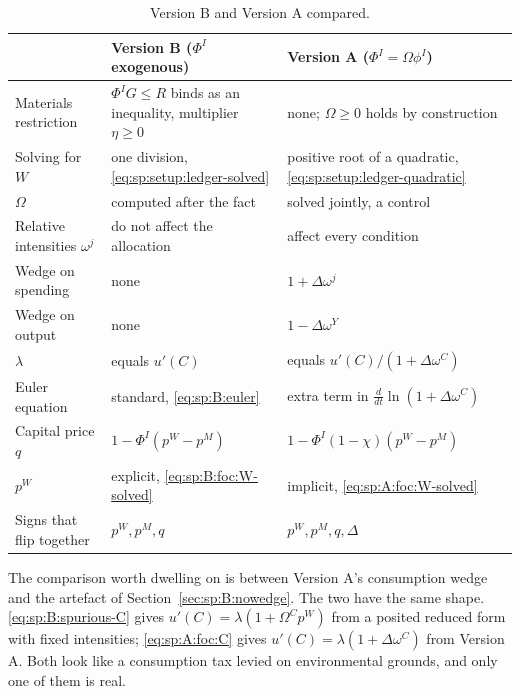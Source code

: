 \begin{table}[H]
\centering
\caption{Version B and Version A compared.}
\label{tab:sp:versions}
\setlength{\tabcolsep}{5pt}
\renewcommand{\arraystretch}{1.05}
\begin{tabular}{@{}p{}p{}p{}@{}}
\toprule
 & Version B ($\Phi^I$ exogenous) & Version A ($\Phi^I=\Omega\phi^I$) \\
\midrule
Materials restriction & $\Phi^IG\le R$ binds as an inequality, multiplier $\eta\ge0$
& none; $\Omega\ge0$ holds by construction \\
Solving for $W$ & one division, \eqref{eq:sp:setup:ledger-solved}
& positive root of a quadratic, \eqref{eq:sp:setup:ledger-quadratic} \\
$\Omega$ & computed after the fact & solved jointly, a control \\
Relative intensities $\omega^j$ & do not affect the allocation & affect every condition \\
Wedge on spending & none & $1+\Delta\omega^j$ \\
Wedge on output & none & $1-\Delta\omega^Y$ \\
$\lambda$ & equals $u'(C)$ & equals $u'(C)/\left(1+\Delta\omega^C\right)$ \\
Euler equation & standard, \eqref{eq:sp:B:euler} & extra term in $\frac{d}{dt}\ln\left(1+\Delta\omega^C\right)$ \\
Capital price $q$ & $1-\Phi^I\left(p^W-p^M\right)$ & $1-\Phi^I\left(1-\chi\right)\left(p^W-p^M\right)$ \\
$p^W$ & explicit, \eqref{eq:sp:B:foc:W-solved} & implicit, \eqref{eq:sp:A:foc:W-solved} \\
Signs that flip together & $p^W,p^M,q$ & $p^W,p^M,q,\Delta$ \\
\bottomrule
\end{tabular}
\end{table}

 The comparison worth dwelling on is between
Version A's consumption wedge and the artefact of Section~\ref{sec:sp:B:nowedge}. The two have the same
shape. \eqref{eq:sp:B:spurious-C} gives $u'(C)=\lambda\left(1+\Omega^Cp^W\right)$ from a posited
reduced form with fixed intensities; \eqref{eq:sp:A:foc:C} gives
$u'(C)=\lambda\left(1+\Delta\omega^C\right)$ from Version A. Both look like a consumption tax levied on
environmental grounds, and only one of them is real.


